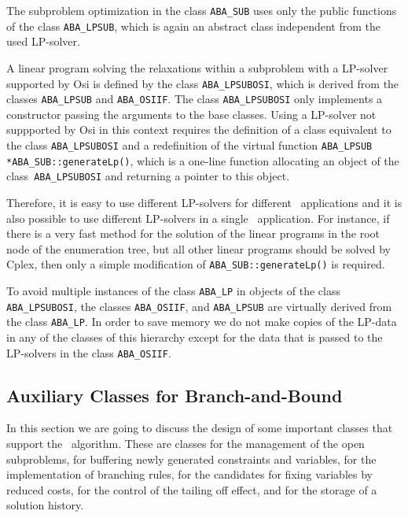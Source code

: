 The subproblem optimization in the class {\tt ABA\_SUB} uses
only the public functions of the class {\tt ABA\_LPSUB}, which
is again an abstract class independent from the used
LP-solver. 

A linear program solving the relaxations within
a subproblem with a LP-solver supported by Osi is defined by the
class {\tt ABA\_LPSUBOSI}, which is derived from the classes
{\tt ABA\_LPSUB} and {\tt ABA\_OSIIF}. The class {\tt ABA\_LPSUBOSI}
only implements a constructor passing the arguments to the base
classes.
Using a LP-solver not suppported by Osi in this context requires the 
definition of a class equivalent to the class {\tt ABA\_LPSUBOSI}
and a redefinition of the virtual function
{\tt ABA\_LPSUB *ABA\_SUB::generateLp()}, which is a one-line function
allocating an object of the class~{\tt ABA\_LPSUBOSI} and returning a pointer
to this object.

Therefore, it is easy to use different LP-solvers
for different \ABACUS\ applications and it is also possible to
use different LP-solvers in a single \ABACUS\ application.
For instance, if there is a very fast method for
the solution of the  linear programs in the root node of the enumeration tree,
but all other linear programs should be solved by Cplex, then
only a simple modification of {\tt ABA\_SUB::generateLp()} is required.

To avoid multiple instances of the class {\tt ABA\_LP} in
objects of the class {\tt ABA\_LPSUBOSI}, 
the classes {\tt ABA\_OSIIF},
and {\tt ABA\_LPSUB} are virtually derived from the class {\tt ABA\_LP}.
In order to save memory we do not make copies of the LP-data in any
of the classes of this hierarchy except for the data that is passed
to the LP-solvers in the class {\tt ABA\_OSIIF}.

\subsection{Auxiliary Classes for Branch-and-Bound}
\label{section:DesignAuxiliaries}

In this section we are going to discuss the design of some important
classes that support the \lpbab\ algorithm. These are classes for
the management of the open subproblems, for buffering newly generated
constraints and variables, for the implementation of branching rules,
for the candidates for fixing variables by reduced costs, for the control
of the tailing off effect, and for the storage of a solution history.

